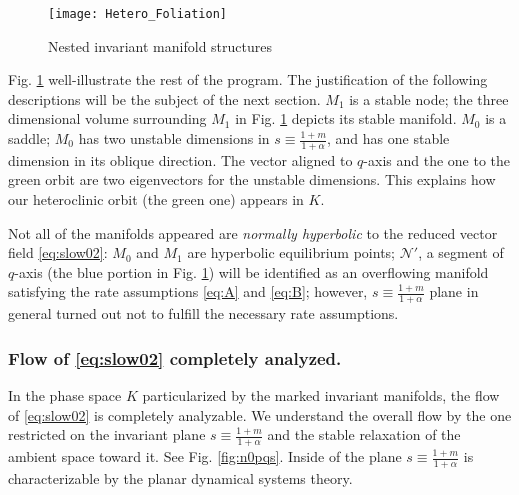 \documentclass[a4paper,11pt]{article}
\theoremstyle{remark}
\begin{document}
\begin{figure}[ht] 
 \centering
 \texttt{[image: Hetero\_Foliation]} 
  \caption{Nested invariant manifold structures} \label{fig:HF} 
\end{figure}
Fig. \ref{fig:HF} well-illustrate the rest of the program. The justification of the following descriptions will be the subject of the next section. $M_1$ is a stable node; the three dimensional volume surrounding $M_1$ in Fig. \ref{fig:HF} depicts its stable manifold. $M_0$ is a saddle; $M_0$ has two unstable dimensions in $s\equiv\tfrac{1+m}{1+\alpha}$, and has one stable dimension in its oblique direction. The vector aligned to $q$-axis and the one to the green orbit are two eigenvectors for the unstable dimensions. This explains how our heteroclinic orbit (the green one) appears in $K$. %

Not all of the manifolds appeared are {\it normally hyperbolic} to the reduced vector field \eqref{eq:slow02}: $M_0$ and $M_1$ are hyperbolic equilibrium points; $\mathcal{N}'$, a segment of $q$-axis (the blue portion in Fig. \ref{fig:HF}) will be identified as an overflowing manifold satisfying the rate assumptions \eqref{eq:A} and \eqref{eq:B}; however, $s\equiv \tfrac{1+m}{1+\alpha}$ plane in general turned out not to fulfill the necessary rate assumptions. 



\subsubsection{Flow of \eqref{eq:slow02} completely analyzed.}%

In the phase space $K$ particularized by the marked invariant manifolds, the flow of \eqref{eq:slow02} is completely analyzable. We understand the overall flow by the one restricted on the invariant plane $s\equiv\tfrac{1+m}{1+\alpha}$ and the stable relaxation of the ambient space toward it. See Fig. \ref{fig:n0pqs}. Inside of the plane $s\equiv\tfrac{1+m}{1+\alpha}$ is characterizable by the planar dynamical systems theory.
\end{document}
